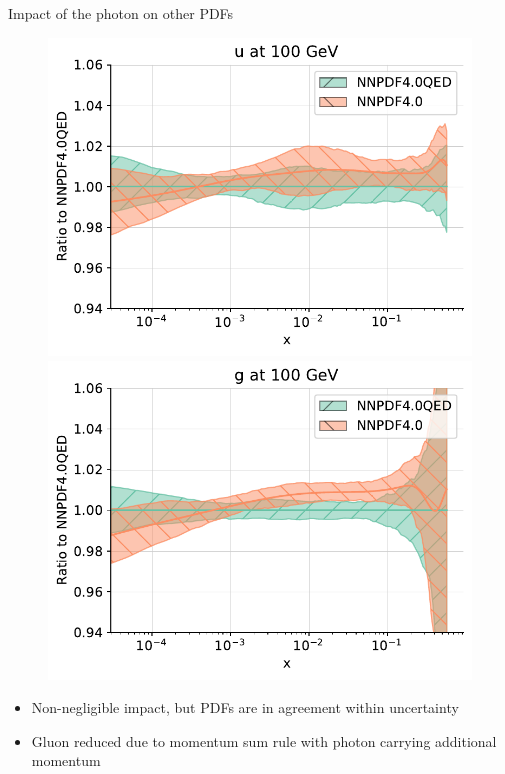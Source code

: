 \documentclass[8pt,t]{beamer}
\begin{document}
\begin{frame}{Impact of the photon on other PDFs}

  \begin{figure}[!t]
    \centering
    \includegraphics[width=.49\textwidth]{figures/plot_pdfs_u_qed.pdf}
    \includegraphics[width=.49\textwidth]{figures/plot_pdfs_g_qed.pdf}\\
  \end{figure}

  \begin{itemize}
    \item Non-negligible impact, but PDFs are in agreement within uncertainty
    \item Gluon reduced due to momentum sum rule with photon carrying additional momentum
  \end{itemize}
\end{frame}


\end{document}
